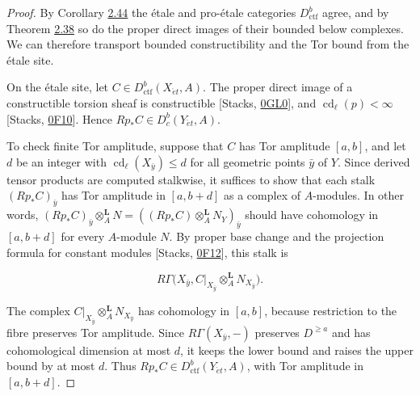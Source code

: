 \documentclass[11pt]{article}
\providecommand{\Dbc}{}\renewcommand{\Dbc}{D^b_c}
\begin{document}
\begin{proof}[{Proof}]\label{bp391}%
By Corollary \hyperref[bp132]{2.44} the étale and pro-étale categories \(D^b_{\mathrm{ctf}}\) agree, and by Theorem \hyperref[bp113]{2.38} so do the proper direct images of their bounded below complexes. We can therefore transport bounded constructibility and the Tor bound from the étale site.

On the étale site, let \(C\in D^b_{\mathrm{ctf}}(X_{\acute{e}t},A)\). The proper direct image of a constructible torsion sheaf is constructible [Stacks, \href{https://stacks.math.columbia.edu/tag/0GL0}{0GL0}], and \(\operatorname{cd}_\ell(p)<\infty\) [Stacks, \href{https://stacks.math.columbia.edu/tag/0F10}{0F10}]. Hence \(Rp_*C\in\Dbc(Y_{\acute{e}t},A)\).

To check finite Tor amplitude, suppose that \(C\) has Tor amplitude \([a,b]\), and let \(d\) be an integer with \(\operatorname{cd}_\ell(X_{\bar y})\leq d\) for all geometric points \(\bar y\) of \(Y\). Since derived tensor products are computed stalkwise, it suffices to show that each stalk \((Rp_*C)_{\bar y}\) has Tor amplitude in \([a,b+d]\) as a complex of \(A\)-modules. In other words, \((Rp_*C)_{\bar y}\otimes^{\mathbf L}_AN=((Rp_*C)\otimes_A^{\mathbf L}N_Y)_{\bar y}\) should have cohomology in \([a,b+d]\) for every \(A\)-module \(N\). By proper base change and the projection formula for constant modules [Stacks, \href{https://stacks.math.columbia.edu/tag/0F12}{0F12}], this stalk is

\[
R\Gamma\bigl(X_{\bar y},
C|_{X_{\bar y}}\otimes_A^{\mathbf L}N_{X_{\bar y}}\bigr).
\]

The complex \(C|_{X_{\bar y}}\otimes_A^{\mathbf L}N_{X_{\bar y}}\) has cohomology in \([a,b]\), because restriction to the fibre preserves Tor amplitude. Since \(R\Gamma(X_{\bar y},-)\) preserves \(D^{\geq a}\) and has cohomological dimension at most \(d\), it keeps the lower bound and raises the upper bound by at most \(d\). Thus \(Rp_*C\in D^b_{\mathrm{ctf}}(Y_{\acute{e}t},A)\), with Tor amplitude in \([a,b+d]\).
\end{proof}


\end{document}
